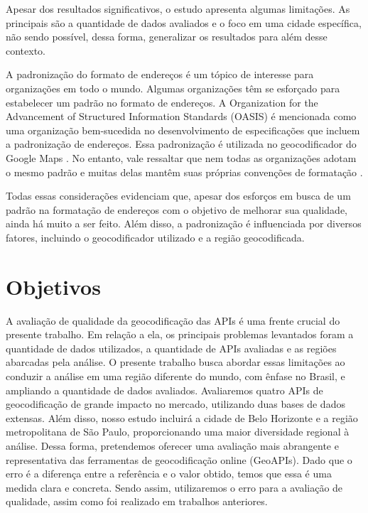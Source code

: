 Apesar dos resultados significativos, o estudo apresenta algumas limitações. As principais são a quantidade de dados avaliados e o foco em uma cidade específica, não sendo possível, dessa forma, generalizar os resultados para além desse contexto.

A padronização do formato de endereços é um tópico de interesse para organizações em todo o mundo. Algumas organizações têm se esforçado para estabelecer um padrão no formato de endereços. A Organization for the Advancement of Structured Information Standards (OASIS) é mencionada como uma organização bem-sucedida no desenvolvimento de especificações que incluem a padronização de endereços. Essa padronização é utilizada no geocodificador do Google Maps \cite{GoogleDoc}. No entanto, vale ressaltar que nem todas as organizações adotam o mesmo padrão e muitas delas mantêm suas próprias convenções de formatação \cite{behr2010}.

Todas essas considerações evidenciam que, apesar dos esforços em busca de um padrão na formatação de endereços com o objetivo de melhorar sua qualidade, ainda há muito a ser feito. Além disso, a padronização é influenciada por diversos fatores, incluindo o geocodificador utilizado e a região geocodificada. 

\section{Objetivos}

A avaliação de qualidade da geocodificação das APIs é uma frente crucial do presente trabalho. Em relação a ela, os principais problemas levantados foram a quantidade de dados utilizados, a quantidade de APIs avaliadas e as regiões abarcadas pela análise. O presente trabalho busca abordar essas limitações ao conduzir a análise em uma região diferente do mundo, com ênfase no Brasil, e ampliando a quantidade de dados avaliados. Avaliaremos quatro APIs de geocodificação de grande impacto no mercado, utilizando duas bases de dados extensas. Além disso, nosso estudo incluirá a cidade de Belo Horizonte e a região metropolitana de São Paulo, proporcionando uma maior diversidade regional à análise. Dessa forma, pretendemos oferecer uma avaliação mais abrangente e representativa das ferramentas de geocodificação online (GeoAPIs). Dado que o erro é a diferença entre a referência e o valor obtido, temos que essa é uma medida clara e concreta. Sendo assim, utilizaremos o erro para a avaliação de qualidade, assim como foi realizado em trabalhos anteriores.

